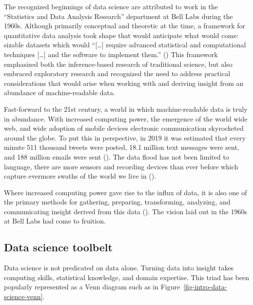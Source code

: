 \documentclass[
  letterpaper,
  DIV=11,
  numbers=noendperiod]{scrreprt}
\theoremstyle{definition}
\theoremstyle{remark}
\begin{document}
The recognized beginnings of data science are attributed to work in the
``Statistics and Data Analysis Research'' department at Bell Labs during
the 1960s. Although primarily conceptual and theoretic at the time, a
framework for quantitative data analysis took shape that would
anticipate what would come: sizable datasets which would ``{[}\ldots{]}
require advanced statistical and computational techniques {[}\ldots{]}
and the software to implement them.''
() This framework emphasized
both the inference-based research of traditional science, but also
embraced exploratory research and recognized the need to address
practical considerations that would arise when working with and deriving
insight from an abundance of machine-readable data.

Fast-forward to the 21st century, a world in which machine-readable data
is truly in abundance. With increased computing power, the emergence of
the world wide web, and wide adoption of mobile devices electronic
communication skyrocketed around the globe. To put this in perspective,
in 2019 it was estimated that every minute 511 thousand tweets were
posted, 18.1 million text messages were sent, and 188 million emails
were sent (). The data flood has not been limited to
language, there are more sensors and recording devices than ever before
which capture evermore swaths of the world we live in
().

Where increased computing power gave rise to the influx of data, it is
also one of the primary methods for gathering, preparing, transforming,
analyzing, and communicating insight derived from this data
(). The vision laid out in the
1960s at Bell Labs had come to fruition.

\subsection{Data science toolbelt}\label{data-science-toolbelt}

Data science is not predicated on data alone. Turning data into insight
takes computing skills, statistical knowledge, and domain expertise.
This triad has been popularly represented as a Venn diagram such as in
Figure~\ref{fig-intro-data-science-venn}.
\end{document}
